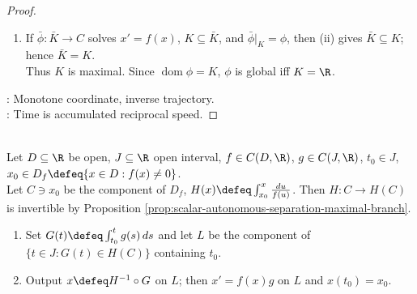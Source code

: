 \begin{proposition}
\begin{proof}
\begin{enumerate}[label=(\roman*)]
If $u:L\to C$ solves $u'=f(u)$ with $0\in L$ and $u(0)=x_0$, then $(H\circ u)'=H'(u)u'=1$ and $(H\circ u)(0)=0$.\\
Hence $H(u(t))=t$, so $L\subseteq K$ and $u=\phi|_L$.
\item If $\bar{\phi}:\bar{K}\to C$ solves $x'=f(x)$, $K\subseteq\bar{K}$, and $\bar{\phi}|_K=\phi$, then (ii) gives $\bar{K}\subseteq K$; hence $\bar{K}=K$.\\
Thus $K$ is maximal. Since $\operatorname{dom}\phi=K$, $\phi$ is global iff $K=\R$.
\end{enumerate}
: Monotone coordinate, inverse trajectory.\\
: Time is accumulated reciprocal speed.
\end{proof}
\end{proposition}

\begin{method} \label{meth:separable-first-order-equation} \\
Let $D\subseteq\R$ be open, $J\subseteq\R$ open interval, $f\in C(D,\R)$, $g\in C(J,\R)$, $t_0\in J$, $x_0\in D_f\defeq\{x\in D:f(x)\neq0\}$.\\
Let $C\ni x_0$ be the component of $D_f$, $H(x)\defeq\int_{x_0}^{x}\frac{du}{f(u)}$. Then $H:C\to H(C)$ is invertible by Proposition \ref{prop:scalar-autonomous-separation-maximal-branch}.
\begin{enumerate}[label=(\roman*)]
\setlength{\itemsep}{0pt}
\item Set $G(t)\defeq\int_{t_0}^{t}g(s)\,ds$ and let $L$ be the component of $\{t\in J:G(t)\in H(C)\}$ containing $t_0$.
\item Output $x\defeq H^{-1}\circ G$ on $L$; then $x'=f(x)g$ on $L$ and $x(t_0)=x_0$.
\end{enumerate}
\end{method}

